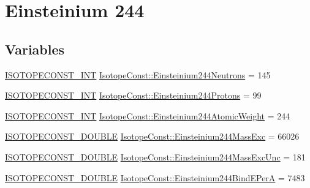 \hypertarget{group___isotope_const-_einsteinium-_es244}{}\section{Einsteinium 244}
\label{group___isotope_const-_einsteinium-_es244}
\subsection*{Variables}
\begin{DoxyCompactItemize}
\item 
\mbox{\hyperlink{group___isotope_const-_macros_ga5f18360b3e99483a35c32d789e62621c}{I\+S\+O\+T\+O\+P\+E\+C\+O\+N\+S\+T\+\_\+\+I\+NT}} \mbox{\hyperlink{group___isotope_const-_einsteinium-_es244_ga3790a8dd1a3bf54b241bbc329f6ec941}{Isotope\+Const\+::\+Einsteinium244\+Neutrons}} = 145
\item 
\mbox{\hyperlink{group___isotope_const-_macros_ga5f18360b3e99483a35c32d789e62621c}{I\+S\+O\+T\+O\+P\+E\+C\+O\+N\+S\+T\+\_\+\+I\+NT}} \mbox{\hyperlink{group___isotope_const-_einsteinium-_es244_gaa6ca03f17c7b6262c5d647e34dc5a802}{Isotope\+Const\+::\+Einsteinium244\+Protons}} = 99
\item 
\mbox{\hyperlink{group___isotope_const-_macros_ga5f18360b3e99483a35c32d789e62621c}{I\+S\+O\+T\+O\+P\+E\+C\+O\+N\+S\+T\+\_\+\+I\+NT}} \mbox{\hyperlink{group___isotope_const-_einsteinium-_es244_ga7e2817366316e463a28e494f6be1e3ce}{Isotope\+Const\+::\+Einsteinium244\+Atomic\+Weight}} = 244
\item 
\mbox{\hyperlink{group___isotope_const-_macros_ga8f45a7272ce02c0b4c65c44636ed719a}{I\+S\+O\+T\+O\+P\+E\+C\+O\+N\+S\+T\+\_\+\+D\+O\+U\+B\+LE}} \mbox{\hyperlink{group___isotope_const-_einsteinium-_es244_ga66e059eb852c87897fd5587051786c9e}{Isotope\+Const\+::\+Einsteinium244\+Mass\+Exc}} = 66026
\item 
\mbox{\hyperlink{group___isotope_const-_macros_ga8f45a7272ce02c0b4c65c44636ed719a}{I\+S\+O\+T\+O\+P\+E\+C\+O\+N\+S\+T\+\_\+\+D\+O\+U\+B\+LE}} \mbox{\hyperlink{group___isotope_const-_einsteinium-_es244_ga3c29f4a61322b8ae9708799c670fb4f4}{Isotope\+Const\+::\+Einsteinium244\+Mass\+Exc\+Unc}} = 181
\item 
\mbox{\hyperlink{group___isotope_const-_macros_ga8f45a7272ce02c0b4c65c44636ed719a}{I\+S\+O\+T\+O\+P\+E\+C\+O\+N\+S\+T\+\_\+\+D\+O\+U\+B\+LE}} \mbox{\hyperlink{group___isotope_const-_einsteinium-_es244_ga0b8ce2d8ebad184bd118726ab1600a79}{Isotope\+Const\+::\+Einsteinium244\+Bind\+E\+PerA}} = 7483
\item 

\end{DoxyCompactItemize}
